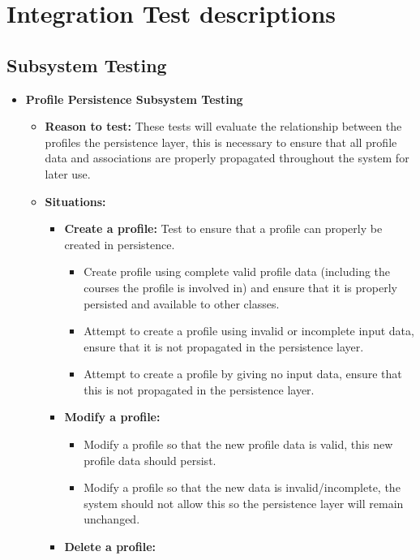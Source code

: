\documentclass[12pt]{report}
\begin{document}
\section{Integration Test descriptions}
\subsection{Subsystem Testing}
\begin{itemize}
    \item \textbf{Profile Persistence Subsystem Testing}
         \begin{itemize}
			 \item \textbf{Reason to test:} These tests will evaluate the relationship between the
				 profiles the persistence layer, this is necessary to ensure that all profile data
				 and associations are properly propagated throughout the system for later use.
             \item \textbf{Situations:}
             \begin{itemize}
				 \item \textbf{Create a profile:} Test to ensure that a profile can properly be
					 created in persistence.
                 \begin{itemize}
					 \item Create profile using complete valid profile data (including the courses
						 the profile is involved in) and ensure that it is properly persisted and
						 available to other classes.
					 \item Attempt to create a profile using invalid or incomplete input data,
						 ensure that it is not propagated in the persistence layer.
					 \item Attempt to create a profile by giving no input data, ensure that this is
						 not propagated in the persistence layer.
                 \end{itemize}
                 \item \textbf{Modify a profile:}
                 \begin{itemize}
					 \item Modify a profile so that the new profile data is valid, this new profile
						 data should persist.
					 \item Modify a profile so that the new data is invalid/incomplete, the system
						 should not allow this so the persistence layer will remain unchanged.
                 \end{itemize}
                 \item \textbf{Delete a profile:}

\end{itemize}
\end{itemize}
\end{itemize}
\end{document}
